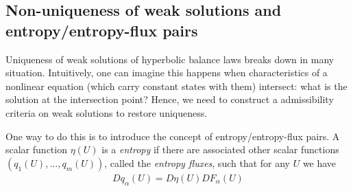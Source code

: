 \documentclass[11pt, reqno]{amsart}
\theoremstyle{definition}
\begin{document}
\subsection{Non-uniqueness of weak solutions and entropy/entropy-flux pairs}

Uniqueness of weak solutions of hyperbolic balance laws breaks down in
many situation. Intuitively, one can imagine this happens when
characteristics of a nonlinear equation (which carry constant states
with them) intersect: what is the solution at the intersection point?
Hence, we need to construct a admissibility criteria on weak solutions
to restore uniqueness.

One way to do this is to introduce the concept of entropy/entropy-flux
pairs. A scalar function $\eta(U)$ is a \emph{entropy} if there are
associated other scalar functions $\left(q_1(U), \ldots,
  q_m(U)\right)$, called the \emph{entropy fluxes}, such that for any
$U$ we have
\begin{align}
  Dq_\alpha(U) = D\eta(U) DF_\alpha(U)
\end{align}
\end{document}
